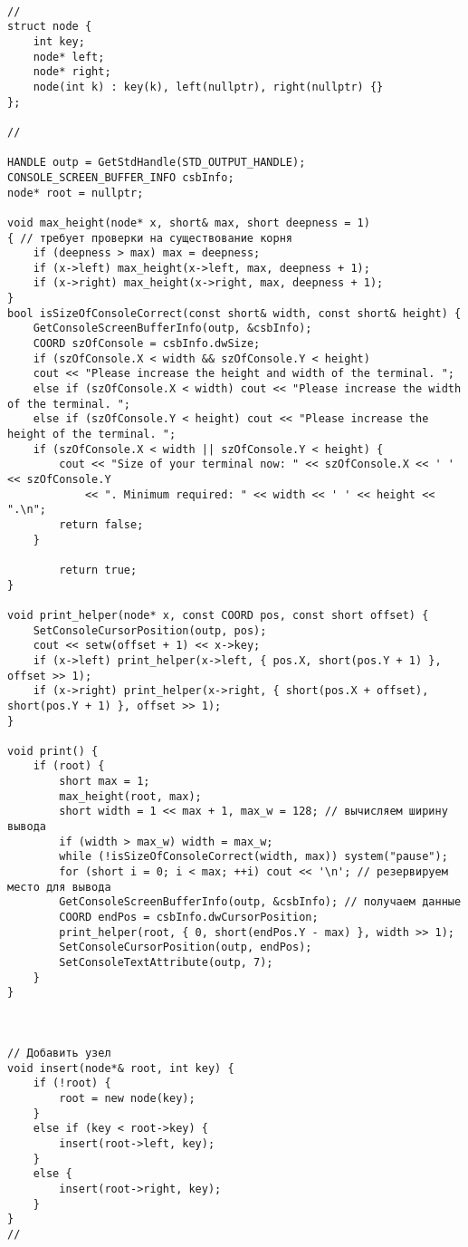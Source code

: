 \documentclass[bachelor, och, referat, times]{SCWorks}
\begin{document}
    \begin{verbatim}
   
//
struct node {
	int key;
	node* left;
	node* right;
	node(int k) : key(k), left(nullptr), right(nullptr) {}
};

//

HANDLE outp = GetStdHandle(STD_OUTPUT_HANDLE);
CONSOLE_SCREEN_BUFFER_INFO csbInfo;
node* root = nullptr;

void max_height(node* x, short& max, short deepness = 1) 
{ // требует проверки на существование корня
	if (deepness > max) max = deepness;
	if (x->left) max_height(x->left, max, deepness + 1);
	if (x->right) max_height(x->right, max, deepness + 1);
}
bool isSizeOfConsoleCorrect(const short& width, const short& height) {
	GetConsoleScreenBufferInfo(outp, &csbInfo);
	COORD szOfConsole = csbInfo.dwSize;
	if (szOfConsole.X < width && szOfConsole.Y < height) 
    cout << "Please increase the height and width of the terminal. ";
	else if (szOfConsole.X < width) cout << "Please increase the width of the terminal. ";
	else if (szOfConsole.Y < height) cout << "Please increase the height of the terminal. ";
	if (szOfConsole.X < width || szOfConsole.Y < height) {
		cout << "Size of your terminal now: " << szOfConsole.X << ' ' << szOfConsole.Y
			<< ". Minimum required: " << width << ' ' << height << ".\n";
		return false;
	}
	
		return true;
}

void print_helper(node* x, const COORD pos, const short offset) {
	SetConsoleCursorPosition(outp, pos);
	cout << setw(offset + 1) << x->key;
	if (x->left) print_helper(x->left, { pos.X, short(pos.Y + 1) }, offset >> 1);
	if (x->right) print_helper(x->right, { short(pos.X + offset), short(pos.Y + 1) }, offset >> 1);
}

void print() {
	if (root) {
		short max = 1;
		max_height(root, max);
		short width = 1 << max + 1, max_w = 128; // вычисляем ширину вывода
		if (width > max_w) width = max_w;
		while (!isSizeOfConsoleCorrect(width, max)) system("pause");
		for (short i = 0; i < max; ++i) cout << '\n'; // резервируем место для вывода
		GetConsoleScreenBufferInfo(outp, &csbInfo); // получаем данные
		COORD endPos = csbInfo.dwCursorPosition;
		print_helper(root, { 0, short(endPos.Y - max) }, width >> 1);
		SetConsoleCursorPosition(outp, endPos);
		SetConsoleTextAttribute(outp, 7);
	}
}



// Добавить узел
void insert(node*& root, int key) {
    if (!root) {
        root = new node(key);
    }
    else if (key < root->key) {
        insert(root->left, key);
    }
    else {
        insert(root->right, key);
    }
}
//


\end{verbatim}
\end{document}
